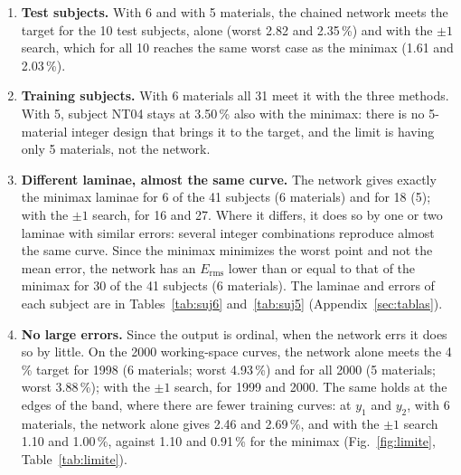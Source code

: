 \begin{enumerate}[label=(\roman*)]
\item \textbf{Test subjects.} With 6 and with 5 materials, the chained network meets the target for the 10 test subjects, alone (worst 2.82 and 2.35\,\%) and with the $\pm1$ search, which for all 10 reaches the same worst case as the minimax (1.61 and 2.03\,\%).
\item \textbf{Training subjects.} With 6 materials all 31 meet it with the three methods. With 5, subject NT04 stays at 3.50\,\% also with the minimax: there is no 5-material integer design that brings it to the target, and the limit is having only 5 materials, not the network.
\item \textbf{Different laminae, almost the same curve.} The network gives exactly the minimax laminae for 6 of the 41 subjects (6 materials) and for 18 (5); with the $\pm1$ search, for 16 and 27. Where it differs, it does so by one or two laminae with similar errors: several integer combinations reproduce almost the same curve. Since the minimax minimizes the worst point and not the mean error, the network has an $E_{\mathrm{rms}}$ lower than or equal to that of the minimax for 30 of the 41 subjects (6 materials). The laminae and errors of each subject are in Tables~\ref{tab:suj6} and~\ref{tab:suj5} (Appendix~\ref{sec:tablas}).
\item \textbf{No large errors.} Since the output is ordinal, when the network errs it does so by little. On the 2000 working-space curves, the network alone meets the 4\,\% target for 1998 (6 materials; worst 4.93\,\%) and for all 2000 (5 materials; worst 3.88\,\%); with the $\pm1$ search, for 1999 and 2000. The same holds at the edges of the band, where there are fewer training curves: at $y_1$ and $y_2$, with 6 materials, the network alone gives 2.46 and 2.69\,\%, and with the $\pm1$ search 1.10 and 1.00\,\%, against 1.10 and 0.91\,\% for the minimax (Fig.~\ref{fig:limite}, Table~\ref{tab:limite}).
\end{enumerate}


